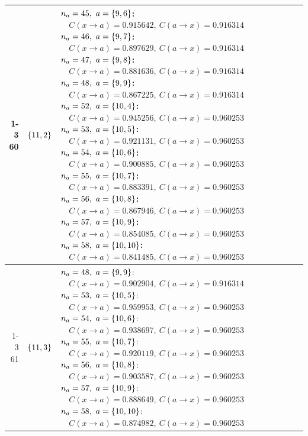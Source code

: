 \begin{longtable}{@{}r l >{\raggedright\arraybackslash}p{}@{}}
  \cmidrule(lr){1-3}
  60 & \(\left\{11,2\right\}\) & \(n_a=45,\ a=\sig{9,6}\):\newline \(\quad C(x\!\to\!a)=0.915642,\ C(a\!\to\!x)=0.916314\)\newline \(n_a=46,\ a=\sig{9,7}\):\newline \(\quad C(x\!\to\!a)=0.897629,\ C(a\!\to\!x)=0.916314\)\newline \(n_a=47,\ a=\sig{9,8}\):\newline \(\quad C(x\!\to\!a)=0.881636,\ C(a\!\to\!x)=0.916314\)\newline \(n_a=48,\ a=\sig{9,9}\):\newline \(\quad C(x\!\to\!a)=0.867225,\ C(a\!\to\!x)=0.916314\)\newline \(n_a=52,\ a=\sig{10,4}\):\newline \(\quad C(x\!\to\!a)=0.945256,\ C(a\!\to\!x)=0.960253\)\newline \(n_a=53,\ a=\sig{10,5}\):\newline \(\quad C(x\!\to\!a)=0.921131,\ C(a\!\to\!x)=0.960253\)\newline \(n_a=54,\ a=\sig{10,6}\):\newline \(\quad C(x\!\to\!a)=0.900885,\ C(a\!\to\!x)=0.960253\)\newline \(n_a=55,\ a=\sig{10,7}\):\newline \(\quad C(x\!\to\!a)=0.883391,\ C(a\!\to\!x)=0.960253\)\newline \(n_a=56,\ a=\sig{10,8}\):\newline \(\quad C(x\!\to\!a)=0.867946,\ C(a\!\to\!x)=0.960253\)\newline \(n_a=57,\ a=\sig{10,9}\):\newline \(\quad C(x\!\to\!a)=0.854085,\ C(a\!\to\!x)=0.960253\)\newline \(n_a=58,\ a=\sig{10,10}\):\newline \(\quad C(x\!\to\!a)=0.841485,\ C(a\!\to\!x)=0.960253\) \\
  \cmidrule(lr){1-3}
  61 & \(\left\{11,3\right\}\) & \(n_a=48,\ a=\sig{9,9}\):\newline \(\quad C(x\!\to\!a)=0.902904,\ C(a\!\to\!x)=0.916314\)\newline \(n_a=53,\ a=\sig{10,5}\):\newline \(\quad C(x\!\to\!a)=0.959953,\ C(a\!\to\!x)=0.960253\)\newline \(n_a=54,\ a=\sig{10,6}\):\newline \(\quad C(x\!\to\!a)=0.938697,\ C(a\!\to\!x)=0.960253\)\newline \(n_a=55,\ a=\sig{10,7}\):\newline \(\quad C(x\!\to\!a)=0.920119,\ C(a\!\to\!x)=0.960253\)\newline \(n_a=56,\ a=\sig{10,8}\):\newline \(\quad C(x\!\to\!a)=0.903587,\ C(a\!\to\!x)=0.960253\)\newline \(n_a=57,\ a=\sig{10,9}\):\newline \(\quad C(x\!\to\!a)=0.888649,\ C(a\!\to\!x)=0.960253\)\newline \(n_a=58,\ a=\sig{10,10}\):\newline \(\quad C(x\!\to\!a)=0.874982,\ C(a\!\to\!x)=0.960253\) \\

\end{longtable}
